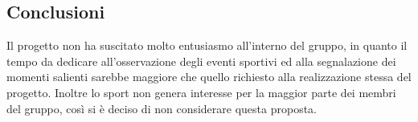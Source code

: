 \documentclass[../studio-di-fattibilita.tex]{subfiles}
\begin{document}
	\subsection{Conclusioni}
	\label{subsec:conclusioni}
	Il progetto non ha suscitato molto entusiasmo all'interno del gruppo, in quanto il tempo da dedicare all'osservazione degli eventi sportivi ed alla segnalazione dei momenti salienti sarebbe maggiore che quello richiesto alla realizzazione stessa del progetto. Inoltre lo sport non genera interesse per la maggior parte dei membri del gruppo, così si è deciso di non considerare questa proposta.
	
\end{document}
